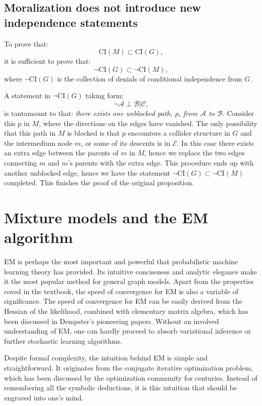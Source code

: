 \documentclass[UTF8]{ctexart}
\begin{document}
\subsection{Moralization does not introduce new independence statements}
To prove that:
$$\text{CI}(M)\subset \text{CI}(G),$$
it is sufficient to prove that:
$$\neg \text{CI}(G)\subset \neg\text{CI}(M),$$
where $\neg\text{CI}(G)$ is the collection of denials of conditional independence from $G$.

A statement in $\neg\text{CI}(G)$ taking form:
$$\neg \mathcal{A}\perp\mathcal{B}|\mathcal{C},$$
is tantamount to that: \emph{there exists one unblocked path, $p$, from $\mathcal{A}$ to $\mathcal{B}$}.
Consider this $p$ in $M$, where the directions on the edges have vanished.
The only possibility that this path in $M$ is blocked is that $p$ encounters a collider structure in $G$ and the intermedium node $m$, or some of its descents is in $\mathcal{E}$.
In this case there exists an extra edge between the parents of $m$ in $M$, hence we replace the two edges connecting $m$ and $m$'s parents with the extra edge.
This procedure ends up with another unblocked edge, hence we have the statement $\neg \text{CI}(G)\subset \neg\text{CI}(M)$ completed.
This finishes the proof of the original proposition.


\newpage
\section{Mixture models and the EM algorithm}
EM is perhaps the most important and powerful that probabilistic machine learning theory has provided.
Its intuitive conciseness and analytic elegance make it the most popular method for general graph models.
Apart from the properties coved in the textbook, the speed of convergence for EM is also a variable of significance.
The speed of convergence for EM can be easily derived from the Hessian of the likelihood, combined with elementary matrix algebra, which has been discussed in Dempster's pioneering papers.
Without an involved understanding of EM, one can hardly proceed to absorb variational inference or further stochastic learning algorithms.

Despite formal complexity, the intuition behind EM is simple and straightforward.
It originates from the conjugate iterative optimization problem, which has been discussed by the optimization community for centuries.
Instead of remembering all the symbolic deductions, it is this intuition that should be engraved into one's mind.
\end{document}
